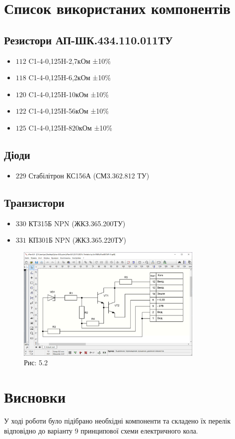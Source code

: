 \documentclass[a4paper]{article}
\begin{document}
\newpage

\section*{Список використаних компонентів}
\subsection*{Резистори АП-ШК.434.110.011ТУ}
\begin{itemize}
    \item $112$ C1-4-0,125H-2,7кОм ±10\%
    \item $118$ C1-4-0,125H-6,2кОм ±10\%
    \item $120$ C1-4-0,125H-10кОм ±10\%
    \item $122$ C1-4-0,125H-56кОм ±10\%
    \item $125$ C1-4-0,125H-820кОм ±10\%
\end{itemize} 

\subsection*{Діоди}
\begin{itemize}
    \item $229$ Стабілітрон КС156А (СМ3.362.812 ТУ)
\end{itemize}

\subsection*{Транзистори}
\begin{itemize}
    \item $330$ КТ315Б NPN (ЖКЗ.365.200ТУ)
    \item $331$ КП301Б NPN (ЖКЗ.365.220ТУ)
\end{itemize}

\begin{figure}[h]
    \centering
    \includegraphics[width=0.8\textwidth]{imgs/PW5.png}
    \caption*{Рис: 5.2}
\end{figure}

\section*{Висновки}
У ході роботи було підібрано необхідні компоненти та складено їх перелік відповідно до варіанту 9 принципової схеми електричного кола.
\end{document}
